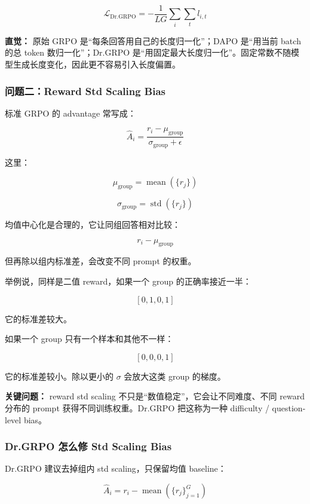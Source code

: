 \[
\mathcal{L}_\text{Dr.GRPO}
=
-
\frac{1}{LG}
\sum_i
\sum_t l_{i,t}
\]

\begin{intubox}
\textbf{直觉：} 原始 GRPO 是“每条回答用自己的长度归一化”；DAPO 是“用当前 batch 的总 token 数归一化”；Dr.GRPO 是“用固定最大长度归一化”。固定常数不随模型生成长度变化，因此更不容易引入长度偏置。
\end{intubox}

\subsubsection{问题二：Reward Std Scaling Bias}

标准 GRPO 的 advantage 常写成：

\[
\hat{A}_i
=
\frac{
r_i-\mu_\text{group}
}{
\sigma_\text{group}+\epsilon
}
\]

这里：

\[
\mu_\text{group}
=
\operatorname{mean}(\{r_j\})
\]

\[
\sigma_\text{group}
=
\operatorname{std}(\{r_j\})
\]

均值中心化是合理的，它让同组回答相对比较：

\[
r_i-\mu_\text{group}
\]

但再除以组内标准差，会改变不同 prompt 的权重。

举例说，同样是二值 reward，如果一个 group 的正确率接近一半：

\[
[0,1,0,1]
\]

它的标准差较大。

如果一个 group 只有一个样本和其他不一样：

\[
[0,0,0,1]
\]

它的标准差较小。除以更小的 $\sigma$ 会放大这类 group 的梯度。

\begin{warnbox}
\textbf{关键问题：} reward std scaling 不只是“数值稳定”，它会让不同难度、不同 reward 分布的 prompt 获得不同训练权重。Dr.GRPO 把这称为一种 difficulty / question-level bias。
\end{warnbox}

\subsubsection{Dr.GRPO 怎么修 Std Scaling Bias}

Dr.GRPO 建议去掉组内 std scaling，只保留均值 baseline：

\[
\hat{A}_i
=
r_i-\operatorname{mean}(\{r_j\}_{j=1}^{G})
\]

